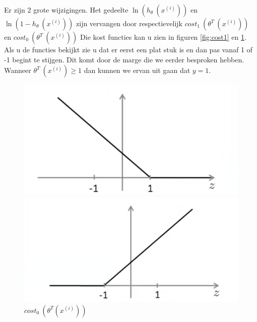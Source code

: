 Er zijn 2 grote wijzigingen. Het gedeelte $\ln(h_{\theta}\:(x^{(i)}))$ en $\ln(1-h_{\theta}\:(x^{(i)}))$ zijn vervangen door respectievelijk $cost_{1}\:(\theta^{T}\:(x^{(i)}))$ en $cost_{0}\:(\theta^{T}\:(x^{(i)})) $ 
Die kost functies kan u zien in figuren \ref{fig:cost1} en \ref{fig:cost0}. Als u de functies bekijkt zie u dat er eerst een plat stuk is en dan pas vanaf 1 of -1 begint te stijgen. Dit komt door de marge die we eerder besproken hebben. Wanneer  $\theta^{T}\:(x^{(i)}) \geq 1$ dan kunnen we ervan uit gaan dat $y=1$.
\begin{figure}
	\centering
	\begin{minipage}{.5\textwidth}
		\centering
		\includegraphics[width=1\linewidth]{img/costEen}
		\caption{$cost_{1}\:(\theta^{T}(x^{(i)}))$}
		\label{fig:cost1}
	\end{minipage}%
	\begin{minipage}{.5\textwidth}
		\centering
		\includegraphics[width=1\linewidth]{img/costNul}
		\caption{$cost_{0}\:(\theta^{T}(x^{(i)})) $}
		\label{fig:cost0}
	\end{minipage}
\end{figure}


